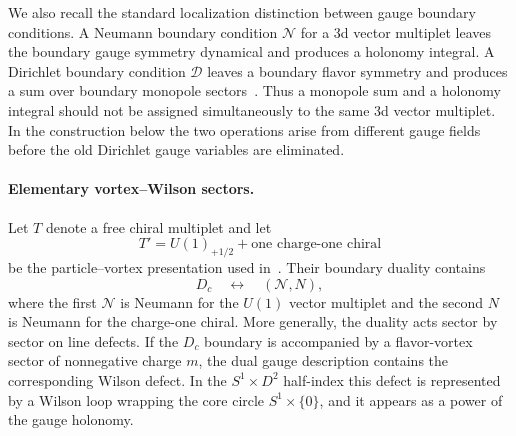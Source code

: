 \documentclass[11pt,a4paper]{article}
\numberwithin{equation}{section}
\begin{document}
We also recall the standard localization distinction between gauge boundary conditions.  A Neumann boundary condition $\mathcal N$ for a 3d vector multiplet leaves the boundary gauge symmetry dynamical and produces a holonomy integral.  A Dirichlet boundary condition $\mathcal D$ leaves a boundary flavor symmetry and produces a sum over boundary monopole sectors~\cite{YoshidaSugiyama:2014S1D2,Dimofte:2017tpi}.  Thus a monopole sum and a holonomy integral should not be assigned simultaneously to the same 3d vector multiplet.  In the construction below the two operations arise from different gauge fields before the old Dirichlet gauge variables are eliminated.

\paragraph{Elementary vortex--Wilson sectors.}
Let $T$ denote a free chiral multiplet and let
\begin{equation}
  T'=U(1)_{+1/2}+\text{one charge-one chiral}
  \label{eq:DGP-elementary-PV-pair}
\end{equation}
be the particle--vortex presentation used in~\cite{Dimofte:2017tpi}.  Their boundary duality contains
\begin{equation}
  D_c\quad\longleftrightarrow\quad(\mathcal N,N),
  \label{eq:DGP-Dc-NN-map}
\end{equation}
where the first $\mathcal N$ is Neumann for the $U(1)$ vector multiplet and the second $N$ is Neumann for the charge-one chiral.  More generally, the duality acts sector by sector on line defects.  If the $D_c$ boundary is accompanied by a flavor-vortex sector of nonnegative charge $m$, the dual gauge description contains the corresponding Wilson defect.  In the $S^1\times D^2$ half-index this defect is represented by a Wilson loop wrapping the core circle $S^1\times\{0\}$, and it appears as a power of the gauge holonomy.
\end{document}
